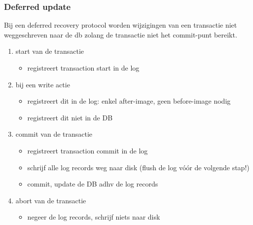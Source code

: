 \documentclass[a4paper,12pt]{article}
\begin{document}
\subsubsection{Deferred update}
Bij een deferred recovery protocol worden wijzigingen van een transactie niet weggeschreven naar de db zolang de transactie niet het commit-punt bereikt.
\begin{enumerate}
\item start van de transactie
	\begin{itemize}
	\item registreert transaction start in de log
	\end{itemize}
\item bij een write actie
	\begin{itemize}
	\item registreert dit in de log: enkel after-image, geen before-image nodig
	\item registreert dit niet in de DB
	\end{itemize}
\item commit van de transactie
	\begin{itemize}
	\item registreert transaction commit in de log
	\item schrijf alle log records weg naar disk (flush de log vóór de volgende stap!)
	\item commit, update de DB adhv de log records
	\end{itemize}
\item abort van de transactie
	\begin{itemize}
	\item negeer de log records, schrijf niets naar disk
	\end{itemize}
\end{enumerate}
\end{document}
